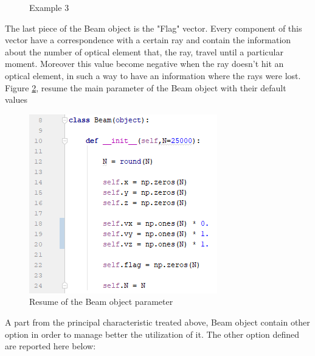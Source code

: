 \begin{figure}[H]
%
\centering
%
\quad
%
%
\caption{Example 3}
\label{fig :p3}
\end{figure}
The last piece of the Beam object is the "Flag" vector. Every component of this vector have a correspondence with a certain ray and contain the information about the number of optical element that, the ray, travel until a particular moment. Moreover this value become negative when the ray doesn't hit an optical element, in such a way to have an information where the rays were lost. Figure \ref{fig: ResumeBeam}, resume the main parameter of the Beam object with their default values
\begin{figure}[H]
%
\centering
%
\includegraphics[width=.4\textwidth]{Immagini/Chapter3/ResumeBeam}
%
\caption{Resume of the Beam object parameter}
%
\label{fig: ResumeBeam}
%
\end{figure}
A part from the principal characteristic treated above, Beam object contain other option in order to manage better the utilization of it. The other option defined are reported here below:
